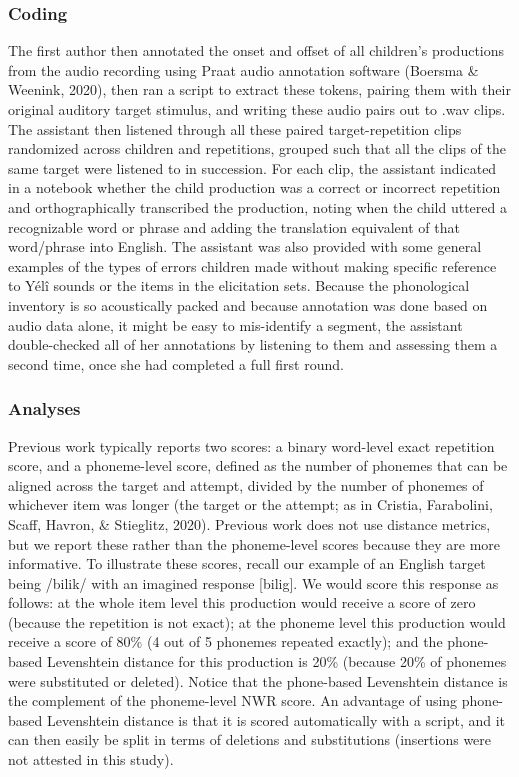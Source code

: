 \documentclass[
  american,
  ,man,floatsintext]{apa6}
\begin{document}
\hypertarget{coding}{%
\subsubsection{Coding}\label{coding}}

The first author then annotated the onset and offset of all children's productions from the audio recording using Praat audio annotation software (Boersma \& Weenink, 2020), then ran a script to extract these tokens, pairing them with their original auditory target stimulus, and writing these audio pairs out to .wav clips. The assistant then listened through all these paired target-repetition clips randomized across children and repetitions, grouped such that all the clips of the same target were listened to in succession. For each clip, the assistant indicated in a notebook whether the child production was a correct or incorrect repetition and orthographically transcribed the production, noting when the child uttered a recognizable word or phrase and adding the translation equivalent of that word/phrase into English. The assistant was also provided with some general examples of the types of errors children made without making specific reference to Yélî sounds or the items in the elicitation sets. Because the phonological inventory is so acoustically packed and because annotation was done based on audio data alone, it might be easy to mis-identify a segment, the assistant double-checked all of her annotations by listening to them and assessing them a second time, once she had completed a full first round.

\hypertarget{analyses}{%
\subsubsection{Analyses}\label{analyses}}

Previous work typically reports two scores: a binary word-level exact repetition score, and a phoneme-level score, defined as the number of phonemes that can be aligned across the target and attempt, divided by the number of phonemes of whichever item was longer (the target or the attempt; as in Cristia, Farabolini, Scaff, Havron, \& Stieglitz, 2020). Previous work does not use distance metrics, but we report these rather than the phoneme-level scores because they are more informative. To illustrate these scores, recall our example of an English target being /bilik/ with an imagined response {[}bilig{]}. We would score this response as follows: at the whole item level this production would receive a score of zero (because the repetition is not exact); at the phoneme level this production would receive a score of 80\% (4 out of 5 phonemes repeated exactly); and the phone-based Levenshtein distance for this production is 20\% (because 20\% of phonemes were substituted or deleted). Notice that the phone-based Levenshtein distance is the complement of the phoneme-level NWR score. An advantage of using phone-based Levenshtein distance is that it is scored automatically with a script, and it can then easily be split in terms of deletions and substitutions (insertions were not attested in this study).
\end{document}

